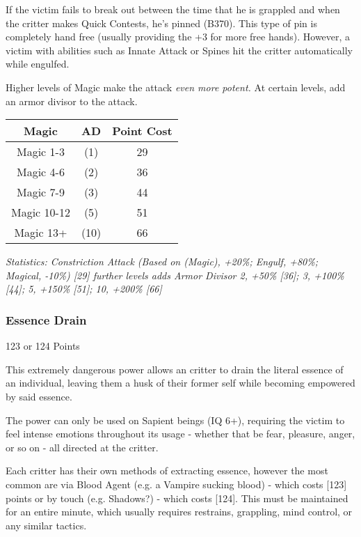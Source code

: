 \begin{multicols*}{3}
	If the victim fails to break out between the time that he is grappled and when the critter makes Quick Contests, he's pinned (B370). This type of pin is completely hand free (usually providing the +3 for more free hands). However, a victim with abilities such as Innate Attack or Spines hit the critter automatically while engulfed.
	
	Higher levels of Magic make the attack \textit{even more potent.} At certain levels, add an armor divisor to the attack.
	
	\begin{center}
		\begin{tabular}{|c|c|c|}
			\hline
			Magic & AD & Point Cost\\
			\hline
			\hline
			Magic 1-3 & (1) & 29 \\
			Magic 4-6 & (2) & 36 \\
			Magic 7-9 & (3) & 44 \\
			Magic 10-12 & (5) & 51 \\
			Magic 13+ & (10) & 66 \\
			\hline
		\end{tabular}
	\end{center}
	
	\textcolor{OliveGreen}{\textit{Statistics: Constriction Attack (Based on (Magic), +20\%; Engulf, +80\%; Magical, -10\%) [29] further levels adds Armor Divisor 2, +50\% [36]; 3, +100\% [44]; 5, +150\% [51]; 10, +200\% [66]}}
	
	
	\subsubsection{Essence Drain}\label{essence_drain}
	\begin{flushright}
		123 or 124 Points
	\end{flushright}
		
	This extremely dangerous power allows an critter to drain the literal essence of an individual, leaving them a husk of their former self while becoming empowered by said essence.
	
	The power can only be used on Sapient beings (IQ 6+), requiring the victim to feel intense emotions throughout its usage - whether that be fear, pleasure, anger, or so on - all directed at the critter.
	
	Each critter has their own methods of extracting essence, however the most common are via Blood Agent (e.g. a Vampire sucking blood) - which costs [123] points or by touch (e.g. Shadows?) - which costs [124]. This must be maintained for an entire minute, which usually requires restrains, grappling, mind control, or any similar tactics.
	

\end{multicols*}
